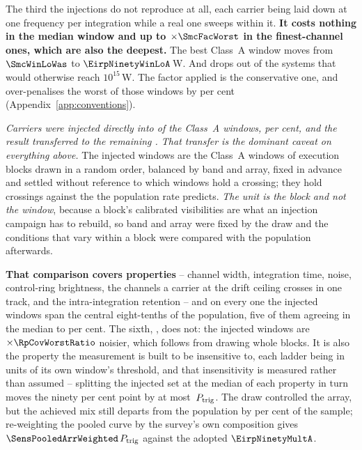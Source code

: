 The third the injections do not reproduce at all, each carrier being laid
down at one frequency per integration while a real one sweeps within it.
\textbf{It costs nothing in the median window and up to
$\times\SmcFacWorst$ in the \SmcNAbove{} finest-channel ones, which are also
the deepest.} The best Class~A window moves from $\SmcWinLoWas$ to
$\EirpNinetyWinLoA$\,W. And \SmcLostStars{} drops out of the
\SmcSysEfifteenWas{} systems that would otherwise reach $10^{15}$\,W. The factor applied is the conservative one, and
over-penalises the worst of those windows by \NmRespOverPct{} per cent
(Appendix~\ref{app:conventions}).

\emph{Carriers were injected directly into \SensNInj{} of the \NWinA{}
Class~A windows, \SensNInjPct{} per cent, and the result transferred to the
remaining \SensNTransfer. That transfer is the dominant caveat on everything
above.} The injected windows are the Class~A windows of execution blocks
drawn in a random order, balanced by band and array, fixed in advance and
settled without reference to which windows hold a crossing; they hold
\SensNCrossAch{} crossings against the \SensNCrossExp{} the population rate
predicts. \emph{The unit is the block and not the window}, because a block's
calibrated visibilities are what an injection campaign has to rebuild, so
band and array were fixed by the draw and the conditions that vary within a
block were compared with the population afterwards.

\textbf{That comparison covers \RpNAxis{} properties} -- channel width,
integration time, noise, control-ring brightness, the channels a carrier at
the drift ceiling crosses in one track, and the intra-integration retention
-- and on every one the injected windows span the central eight-tenths of the
population, five of them agreeing in the median to \RpCovOtherPct{} per cent.
The sixth, \RpCovWorstAxis, does not: the injected windows are
$\times\RpCovWorstRatio$ noisier, which follows from drawing whole blocks. It
is also the property the measurement is built to be insensitive to, each
ladder being in units of its own window's threshold, and that insensitivity
is measured rather than assumed -- splitting the injected set at the median
of each property in turn moves the ninety per cent point by at most
\RpFacShiftMax\,$P_{\rm trig}$. The draw controlled the array, but the
achieved mix still departs from the population by \SensCovWorstPct{} per cent
of the sample; re-weighting the pooled curve by the survey's own composition
gives $\SensPooledArrWeighted\,P_{\rm trig}$ against the adopted
$\EirpNinetyMultA$.

